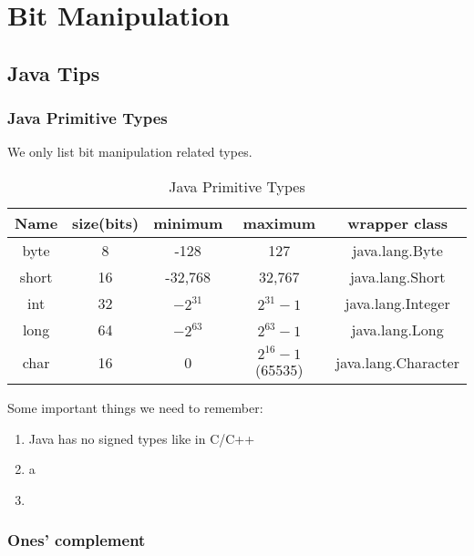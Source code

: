 \chapter{Bit Manipulation}




\section{Java Tips  }
\subsection{Java Primitive  Types } 


We only list bit manipulation related types.
\begin{table}[ht]
\caption{Java Primitive  Types} %
\centering %
\begin{tabular}{ | c | c | c | c | c |  }
 \hline
          Name   &  size(bits) & minimum    & maximum &  wrapper class   \\
 \hline
          byte   &  8          & -128       &  127    &  java.lang.Byte \\
 \hline
          short   &  16        &  -32,768   &   32,767     &  java.lang.Short \\
 \hline
          int   &   32          & ${-2^{31}}$       &   ${2^{31}-1}$    &  java.lang.Integer \\
 \hline
          long   &  64         & ${-2^{63}}$       &  ${2^{63}-1}$   &  java.lang.Long \\
 \hline
           char   &  16         & 0         &  ${2^{16}-1}$ (65535) &  java.lang.Character \\
 \hline

\end{tabular}
\label{tab:java_types} %

\end{table}

Some important things we need to remember:
\begin{enumerate}
    \item   Java has no signed types like in C/C++

    \item   a

    \item

\end{enumerate}

\subsection{Ones' complement } 

